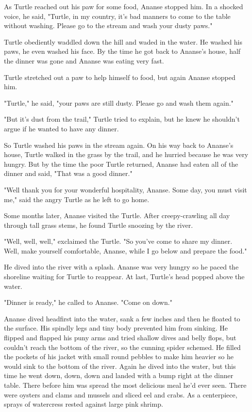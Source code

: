 As Turtle reached out his paw for some food, Ananse stopped him. In a shocked voice, he said, "Turtle, in my country, it's bad manners to come to the table without washing. Please go to the stream and wash your dusty paws."

Turtle obediently waddled down the hill and waded in the water. He washed his paws, he even washed his face. By the time he got back to Ananse's house, half the dinner was gone and Ananse was eating very fast.

Turtle stretched out a paw to help himself to food, but again Ananse stopped him.

"Turtle," he said, "your paws are still dusty. Please go and wash them again."

"But it's dust from the trail," Turtle tried to explain, but he knew he shouldn't argue if he wanted to have any dinner.

So Turtle washed his paws in the stream again. On his way back to Ananse's house, Turtle walked in the grass by the trail, and he hurried because he was very hungry. But by the time the poor Turtle returned, Ananse had eaten all of the dinner and said, "That was a good dinner."

"Well thank you for your wonderful hospitality, Ananse. Some day, you must visit me," said the angry Turtle as he left to go home.

Some months later, Ananse visited the Turtle. After creepy-crawling all day through tall grass stems, he found Turtle snoozing by the river.

"Well, well, well," exclaimed the Turtle. "So you've come to share my dinner. Well, make yourself comfortable, Ananse, while I go below and prepare the food."

He dived into the river with a splash. Ananse was very hungry so he paced the shoreline waiting for Turtle to reappear. At last, Turtle's head popped above the water.

"Dinner is ready," he called to Ananse. "Come on down."

Ananse dived headfirst into the water, sank a few inches and then he floated to the surface. His spindly legs and tiny body prevented him from sinking. He flipped and flapped his puny arms and tried shallow dives and belly flops, but couldn't reach the bottom of the river, so the cunning spider schemed. He filled the pockets of his jacket with small round pebbles to make him heavier so he would sink to the bottom of the river. Again he dived into the water, but this time he went down, down, down and landed with a bump right at the dinner table. There before him was spread the most delicious meal he'd ever seen. There were oysters and clams and mussels and sliced eel and crabs. As a centerpiece, sprays of watercress rested against large pink shrimp.

